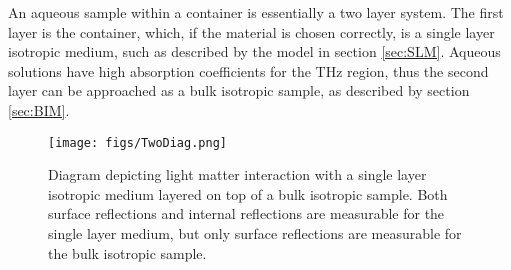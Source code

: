 An aqueous sample within a container is essentially a two layer system. The first layer is the container, which, if the material is chosen correctly, is a single layer isotropic medium, such as described by the model in section \ref{sec:SLM}. Aqueous solutions have high absorption coefficients for the THz region, thus the second layer can be approached as a bulk isotropic sample, as described by section \ref{sec:BIM}.
\begin{figure}[H]
\begin{center}
	 \texttt{[image: figs/TwoDiag.png]}
	 \caption{Diagram depicting light matter interaction with a single layer isotropic medium layered on top of a bulk isotropic sample. Both surface reflections and internal reflections are measurable for the single layer medium, but only surface reflections are measurable for the bulk isotropic sample.}
   \label{fig:TwoDiag}
\end{center}
\end{figure}
\endinput